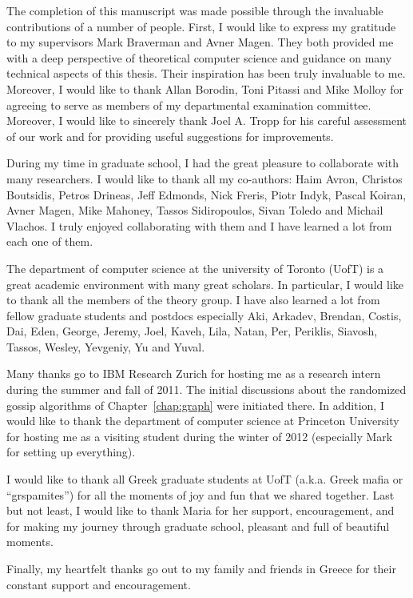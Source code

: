 The completion of this manuscript was made possible through the invaluable contributions of a number of people. First, I would like to express my gratitude to my supervisors Mark Braverman and Avner Magen. They both provided me with a deep perspective of theoretical computer science and guidance on many technical aspects of this thesis. Their inspiration has been truly invaluable to me. Moreover, I would like to thank Allan Borodin, Toni Pitassi and Mike Molloy for agreeing to serve as members of my departmental examination committee. Moreover, I would like to sincerely thank Joel A. Tropp for his careful assessment of our work and for providing useful suggestions for improvements.
%

%
During my time in graduate school, I had the great pleasure to collaborate with many researchers. I would like to thank all my co-authors: Haim Avron, Christos Boutsidis, Petros Drineas, Jeff Edmonds, Nick Freris, Piotr Indyk, Pascal Koiran, Avner Magen, Mike Mahoney, Tassos Sidiropoulos, Sivan Toledo and Michail Vlachos. I truly enjoyed collaborating with them and I have learned a lot from each one of them.
%

%
The department of computer science at the university of Toronto (UofT) is a great academic environment with many great scholars. In particular, I would like to thank all the members of the theory group. I have also learned a lot from fellow graduate students and postdocs especially Aki, Arkadev, Brendan, Costis, Dai, Eden, George, Jeremy, Joel, Kaveh, Lila,  Natan, Per, Periklis, Siavosh, Tassos, Wesley, Yevgeniy, Yu and Yuval.
%

%
Many thanks go to IBM Research Zurich for hosting me as a research intern during the summer and fall of 2011. The initial discussions about the randomized gossip algorithms of Chapter~\ref{chap:graph} were initiated there. In addition, I would like to thank the department of computer science at Princeton University for hosting me as a visiting student during the winter of 2012 (especially Mark for setting up everything).
%

%
I would like to thank all Greek graduate students at UofT (a.k.a. Greek mafia or ``grspamites'') for all the moments of joy and fun that we shared together. Last but not least, I would like to thank Maria for her support, encouragement, and for making my journey through graduate school, pleasant and full of beautiful moments.
%

%
Finally, my heartfelt thanks go out to my family and friends in Greece for their constant support and encouragement.